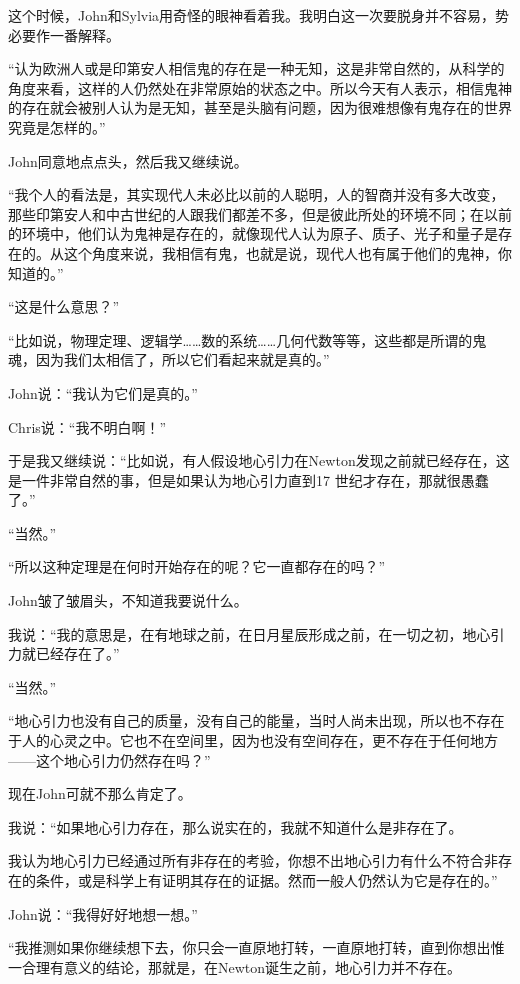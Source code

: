\documentclass[UTF8]{article}
\begin{document}
\par 这个时候，John和Sylvia用奇怪的眼神看着我。我明白这一次要脱身并不容易，势必要作一番解释。
\par “认为欧洲人或是印第安人相信鬼的存在是一种无知，这是非常自然的，从科学的角度来看，这样的人仍然处在非常原始的状态之中。所以今天有人表示，相信鬼神的存在就会被别人认为是无知，甚至是头脑有问题，因为很难想像有鬼存在的世界究竟是怎样的。”
\par John同意地点点头，然后我又继续说。
\par “我个人的看法是，其实现代人未必比以前的人聪明，人的智商并没有多大改变，那些印第安人和中古世纪的人跟我们都差不多，但是彼此所处的环境不同；在以前的环境中，他们认为鬼神是存在的，就像现代人认为原子、质子、光子和量子是存在的。从这个角度来说，我相信有鬼，也就是说，现代人也有属于他们的鬼神，你知道的。”
\par “这是什么意思？”
\par “比如说，物理定理、逻辑学……数的系统……几何代数等等，这些都是所谓的鬼魂，因为我们太相信了，所以它们看起来就是真的。”
\par John说：“我认为它们是真的。”
\par Chris说：“我不明白啊！”
\par 于是我又继续说：“比如说，有人假设地心引力在Newton发现之前就已经存在，这是一件非常自然的事，但是如果认为地心引力直到17 世纪才存在，那就很愚蠢了。”
\par “当然。”
\par “所以这种定理是在何时开始存在的呢？它一直都存在的吗？”
\par John皱了皱眉头，不知道我要说什么。
\par 我说：“我的意思是，在有地球之前，在日月星辰形成之前，在一切之初，地心引力就已经存在了。”
\par “当然。”
\par “地心引力也没有自己的质量，没有自己的能量，当时人尚未出现，所以也不存在于人的心灵之中。它也不在空间里，因为也没有空间存在，更不存在于任何地方——这个地心引力仍然存在吗？”
\par 现在John可就不那么肯定了。
\par 我说：“如果地心引力存在，那么说实在的，我就不知道什么是非存在了。
\par 我认为地心引力已经通过所有非存在的考验，你想不出地心引力有什么不符合非存在的条件，或是科学上有证明其存在的证据。然而一般人仍然认为它是存在的。”
\par John说：“我得好好地想一想。”
\par “我推测如果你继续想下去，你只会一直原地打转，一直原地打转，直到你想出惟一合理有意义的结论，那就是，在Newton诞生之前，地心引力并不存在。
\end{document}
